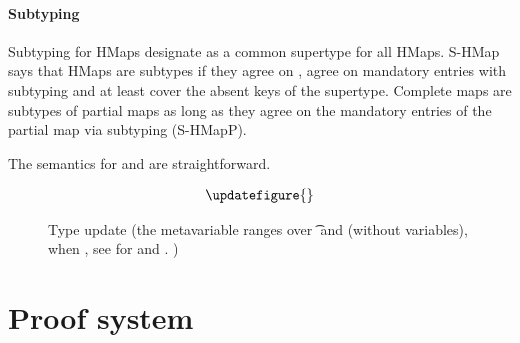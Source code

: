 
\paragraph{Subtyping}
Subtyping for HMaps
designate \MapLiteral{} as a common supertype for all HMaps.
S-HMap says that HMaps are subtypes if they agree
on \completenessmeta{}, agree on mandatory entries with subtyping
and at least cover the absent keys of the supertype.
Complete maps are subtypes of partial maps
as long as they agree on the mandatory entries of the partial map via subtyping (S-HMapP).



The semantics for \getliteral{} and \assocliteral{} are straightforward.

\begin{figure}[t]
  $$
\begin{array}{llll}
\updatefigure{}
\end{array}
$$
\caption{Type update (the metavariable \propisnotmeta{} ranges over \t{} and \nottype{\t{}} (without variables), 
  \notsubtypein{}{\Nil{}}{\nottype{\t{}}} when \issubtypein{}{\Nil{}}{\t{}}, see
 for \restrictliteral{} and \removeliteral{}.
  )}
\label{main:figure:update}
\end{figure}


\section{Proof system}
\label{formalmodel:proofsystem}

